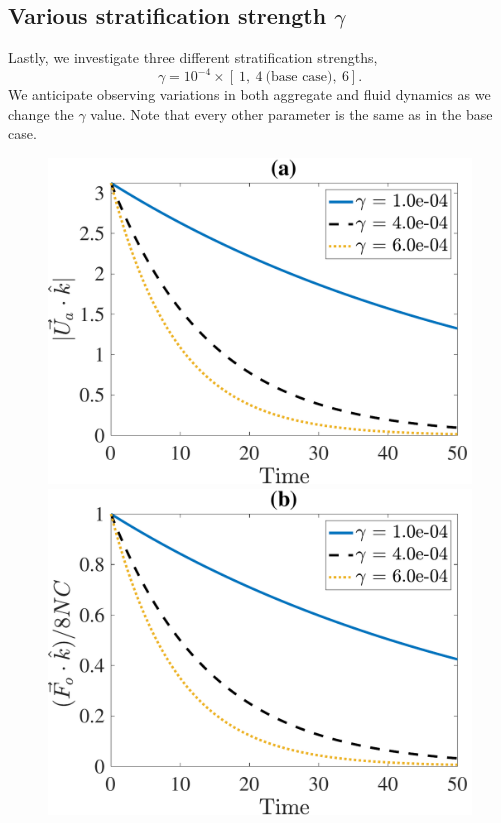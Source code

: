 \subsection{Various stratification strength $\gamma$}
Lastly, we investigate three different stratification strengths, 
\[
\gamma = 10^{-4} \times \left[ \ 1, \ 4 \ \text{(base case)}, \  6 \right].
\]
We anticipate observing variations in both aggregate and fluid dynamics as we change the $\gamma$ value. Note that every other parameter is the same as in the base case. 
\begin{figure}[h]
	\begin{center}
		\includegraphics[scale=0.35]{./figures/fig_NC50_g_Ua3_all}
		\includegraphics[scale=0.35]{./figures/fig_NC50_g_Fo3_all}

\end{center}
\end{figure}
